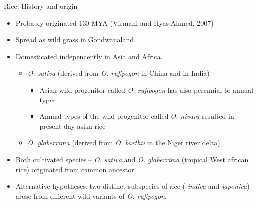 \documentclass[
  ignorenonframetext,
  aspectratio=169]{beamer}
\providecommand{\tightlist}{%
  \setlength{\itemsep}{0pt}\setlength{\parskip}{0pt}}
\begin{document}
\begin{frame}{Rice: History and origin}
\protect\hypertarget{rice-history-and-origin}{}
\begin{itemize}
\tightlist
\item
  Probably originated 130 MYA (Virmani and IIyas-Ahmed, 2007)
\item
  Spread as wild grass in Gondwanaland.
\item
  Domesticated independently in Asia and Africa.

  \begin{itemize}
  \tightlist
  \item
    \emph{O. sativa} (derived from \emph{O. rufipogon} in China and in
    India)

    \begin{itemize}
    \tightlist
    \item
      Asian wild progenitor called \emph{O. rufipogon} has also
      perennial to annual types
    \item
      Annual types of the wild progenitor called \emph{O. nivara}
      resulted in present day asian rice
    \end{itemize}
  \item
    \emph{O. glaberrima} (derived from \emph{O. barthii} in the Niger
    river delta)
  \end{itemize}
\item
  Both cultivated species -- \emph{O. sativa} and \emph{O. glaberrima}
  (tropical West african rice) originated from common ancestor.
\item
  Alternative hypotheses: two distinct subspecies of rice (
  \emph{indica} and \emph{japonica}) arose from different wild variants
  of \emph{O. rufipogon}.
\end{itemize}
\end{frame}
\end{document}
